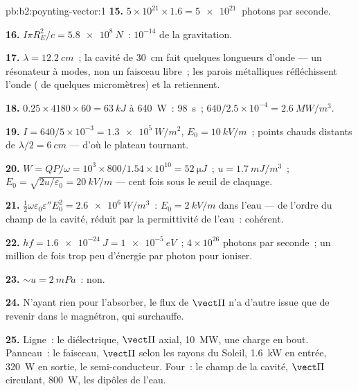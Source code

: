 \begin{solution}{pb:b2:poynting-vector:1}
\textbf{15.} $5 \times 10^{21} \times 1.6 = \qty{5e21}{}$ photons par seconde.

\textbf{16.} $I\pi R_E^2/c = \qty{5.8e8}{N}$~: $10^{-14}$ de la gravitation.

\textbf{17.} $\lambda = \qty{12.2}{cm}$~; la cavité de \qty{30}{cm} fait quelques longueurs d'onde
--- un résonateur à modes, non un faisceau libre~; les parois métalliques réfléchissent
l'onde ( de quelques micromètres) et la retiennent.

\textbf{18.} $0.25 \times 4180 \times 60 = \qty{63}{kJ}$ à \qty{640}{W}~: \qty{98}{s}~;
$640/2.5 \times 10^{-4} = \qty{2.6}{MW/m^3}$.

\textbf{19.} $I = 640/5 \times 10^{-3} = \qty{1.3e5}{W/m^2}$, $E_0 = \qty{10}{kV/m}$~; points chauds
distants de $\lambda/2 = \qty{6}{cm}$ --- d'où le plateau tournant.

\textbf{20.} $W = QP/\omega = 10^3 \times 800/1.54 \times 10^{10} = \qty{52}{\micro J}$~; $u =
\qty{1.7}{mJ/m^3}$~; $E_0 = \sqrt{2u/\varepsilon_0} = \qty{20}{kV/m}$ --- cent fois sous le
seuil de claquage.

\textbf{21.} $\tfrac12\omega\varepsilon_0\varepsilon''E_0^2 = \qty{2.6e6}{W/m^3}$~: $E_0 = \qty{2}{kV/m}$
dans l'eau --- de l'ordre du champ de la cavité, réduit par la
permittivité de l'eau~: cohérent.

\textbf{22.} $hf = \qty{1.6e-24}{J} = \qty{1e-5}{eV}$~; $4 \times 10^{26}$ photons par seconde~;
un million de fois trop peu d'énergie par photon pour ioniser.

\textbf{23.} $\sim u = \qty{2}{mPa}$~: non.

\textbf{24.} N'ayant rien pour l'absorber, le flux de $\vect\Pi$ n'a
d'autre issue que de revenir dans le magnétron, qui surchauffe.

\textbf{25.} Ligne~: le diélectrique, $\vect\Pi$ axial, \qty{10}{MW}, une charge en
bout. Panneau~: le faisceau, $\vect\Pi$ selon les rayons du Soleil, \qty{1.6}{kW}
en entrée, \qty{320}{W} en sortie, le semi-conducteur. Four~: le champ de la cavité, $\vect\Pi$
circulant, \qty{800}{W}, les dipôles de l'eau.
\end{solution}
